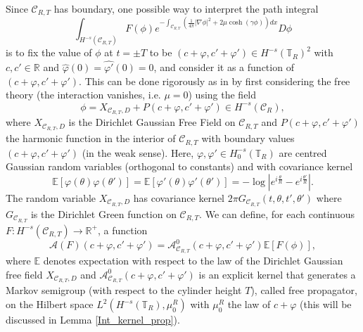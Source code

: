 \documentclass[11pt]{amsart}
\numberwithin{equation}{section}
\theoremstyle{definition}
\newcommand{\R}{\mathbb{R}}
\def\E{\mathbb{E}}
\newcommand{\mc}{\mathcal}
\def\T{\mathbb{T}}
\begin{document}
Since $\mathcal{C}_{R,T}$ has boundary, one possible way to interpret the path integral 
\begin{equation}\label{Path_Int_CRT}
\int_{H^{-s}(\mc{C}_{R,T})} F(\phi) e^{- \int_{\mathcal{C}_{R,T}}( \frac 1{4\pi}|\nabla \phi|^2+2\mu\cosh(\gamma \phi))dx} D\phi
\end{equation}
is to fix the value of $\phi$ at $t=\pm T$ to be $(c+\varphi,c'+\varphi')\in H^{-s}(\T_R)^2$ with $c,c'\in \R$ and $\hat{\varphi}(0)= \hat{\varphi'}(0)=0$,
and consider it as a function 
of $(c+\varphi,c'+\varphi')$. This can be done rigorously as in \cite{GKRV21_Segal} by first considering the free theory (the interaction vanishes, i.e. $\mu=0$) using the field 
\[ \phi = X_{\mc{C}_{R,T},D}+P(c+\varphi,c'+\varphi')\in H^{-s}(\mc{C}_R),\] 
where $X_{\mc{C}_{R,T},D}$ is the Dirichlet Gaussian Free Field on $\mc{C}_{R,T}$ and $P(c+\varphi,c'+\varphi')$ the harmonic function in the interior of $\mc{C}_{R,T}$ with boundary values $(c+\varphi,c'+\varphi')$ (in the weak sense). Here, 
$\varphi,\varphi'\in H^{-s}_0(\T_R)$ are centred Gaussian random variables (orthogonal to constants) and with covariance kernel 
\[ \E[ \varphi(\theta)\varphi(\theta')]=
\E[ \varphi'(\theta)\varphi'(\theta')]=-\log|e^{i\frac{\theta}{R}}-e^{i\frac{\theta'}{R}}|.\] 
The random variable  $X_{\mc{C}_{R,T},D}$ has covariance kernel $2\pi G_{\mc{C}_{R,T}}(t,\theta,t',\theta')$ where $G_{\mc{C}_{R,T}}$ is the Dirichlet Green function on $\mc{C}_{R,T}$.
We can define, for each continuous  $F:H^{-s}(\mc{C}_{R,T})\to \R^+$, a function 
\begin{equation}
\mc{A}(F)(c+\varphi, c'+\varphi')
=\mc{A}^0_{\mc{C}_{R,T}}(c+\varphi, c'+\varphi')\mathbb{E}[F(\phi)],
\end{equation}
where $\mathbb{E}$ denotes expectation with respect to the law of the Dirichlet Gaussian free field $X_{\mc{C}_{R,T},D}$ and $\mc{A}^0_{\mc{C}_{R,T}}(c+\varphi, c'+\varphi')$ is an explicit kernel that generates a Markov semigroup (with respect to the cylinder height $T$), called free propagator, on the Hilbert 
space $L^2(H^{-s}(\T_R),\mu_0^R)$ with $\mu_0^R$ the law of $c+\varphi$ (this will be discussed in Lemma \ref{Int_kernel_prop}).
\end{document}
